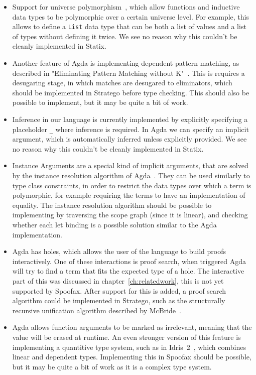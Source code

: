 \begin{itemize}
	\item Support for universe polymorphism~\cite[Universe Levels]{agda}, which allow functions and inductive data types to be polymorphic over a certain universe level. For example, this allows to define a \verb|List| data type that can be both a list of values and a list of types without defining it twice. We see no reason why this couldn't be cleanly implemented in Statix. 
	\item Another feature of Agda is implementing dependent pattern matching, as described in "Eliminating Pattern Matching without K"~\cite{patternmatching}. This is requires a desugaring stage, in which matches are desugared to eliminators, which should be implemented in Stratego before type checking. This should also be possible to implement, but it may be quite a bit of work.
	\item Inference in our language is currently implemented by explicitly specifying a placeholder \verb|_| where inference is required. In Agda we can specify an implicit argument, which is automatically inferred unless explicitly provided. We see no reason why this couldn't be cleanly implemented in Statix. 
	\item Instance Arguments are a special kind of implicit arguments, that are solved by the instance resolution algorithm of Agda~\cite[Instance Arguments]{agda}. They can be used similarly to type class constraints, in order to restrict the data types over which a term is polymorphic, for example requiring the terms to have an implementation of equality. The instance resolution algorithm should be possible to implementing by traversing the scope graph (since it is linear), and checking whether each let binding is a possible solution similar to the Agda implementation. 
	\item Agda has holes, which allows the user of the language to build proofs interactively. One of these interactions is proof search, when triggered Agda will try to find a term that fits the expected type of a hole. The interactive part of this was discussed in chapter~\ref{ch:relatedwork}, this is not yet supported by Spoofax. After support for this is added, a proof search algorithm could be implemented in Stratego, such as the structurally recursive unification algorithm described by McBride~\cite{proofsearch}.
	\item Agda allows function arguments to be marked as irrelevant, meaning that the value will be erased at runtime. An even stronger version of this feature is implementing a quantitive type system, such as in Idris~2~\cite{idris2}, which combines linear and dependent types. Implementing this in Spoofax should be possible, but it may be quite a bit of work as it is a complex type system.

\end{itemize}
